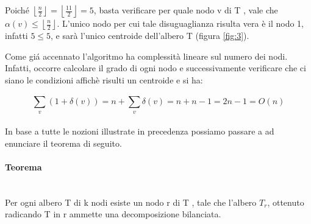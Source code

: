 Poich\'e $ \left\lfloor\frac{n}{2} \right\rfloor = \left\lfloor \frac{11}{2} \right\rfloor = 5$, basta verificare per quale nodo v di T , vale che $\alpha(v) \le \left\lfloor\frac{n}{2} \right\rfloor$.
L'unico nodo per cui tale disuguaglianza risulta vera \`e il nodo 1, infatti $5\le 5$, e sar\`a l'unico centroide dell'albero T (figura \ref{fig:3}).


Come gi\'a accennato l'algoritmo ha complessit\`a lineare sul numero dei nodi.
Infatti, occorre calcolare il grado di ogni nodo e successivamente verificare che ci siano le condizioni affich\`e risulti un centroide e si ha:

\begin{equation*}
\sum_{v}^{}(1 + \delta(v)) = n + \sum_{v}^{} \delta(v) = n+n-1= 2n-1 =O(n)
\end{equation*}\\
In base a tutte le nozioni illustrate in precedenza possiamo passare a ad enunciare il  teorema di seguito.

\paragraph{Teorema}\mbox{}\\
Per ogni albero T di k nodi esiste un nodo r di T , tale che l’albero $T_r$, ottenuto radicando T in r ammette una decomposizione bilanciata.

